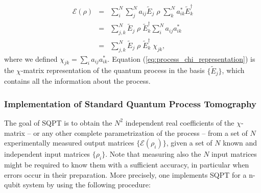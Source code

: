 \begin{eqnarray}
 \mathcal{E}(\rho) & = & \sum\limits_i^N \sum\limits_j^{N} a_{ij} \tilde{E}_j \;\rho\; \sum\limits_k^{N} a_{ik}^* \tilde{E}_k^\dagger \\
& = & \sum\limits_{j,k}^{N}\tilde{E}_j \; \rho \; \tilde{E}_k^\dagger \sum\limits_i^N a_{ij} a_{ik}^* \\
& = & \sum\limits_{j,k}^{N}\tilde{E}_j \; \rho \; \tilde{E}_k^\dagger \; \chi_{jk}, \label{eq:process_chi_representation}
\end{eqnarray}
where we defined $\chi_{jk} = \sum\limits_i a_{ij} a_{ik}^*$. Equation (\ref{eq:process_chi_representation}) is the $\chi$-matrix representation of the quantum process in the basis $\{\tilde{E}_j\}$, which contains all the information about the process.

\subsubsection{Implementation of Standard Quantum Process Tomography}

The goal of SQPT is to obtain the $N^2$ independent real coefficients of the $\chi$-matrix -- or any other complete parametrization of the process -- from a set of $N$ experimentally measured output matrices $\{\mathcal{E}(\rho_i)\}$, given a set of $N$ known and independent  input matrices $\{\rho_i\}$. Note that measuring also the  $N$ input matrices might be required to know them with a sufficient accuracy, in particular when errors occur in their preparation. More precisely, one implements SQPT for a n-qubit system by using the following procedure:

